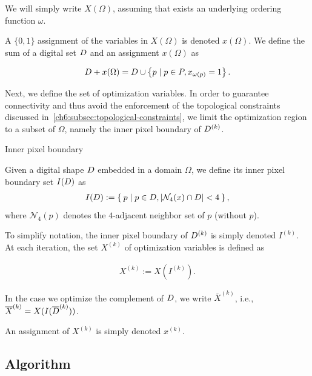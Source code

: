 We will simply write $X(\Omega)$, assuming that exists an underlying ordering function $\omega$.

A $\{0,1\}$ assignment of the variables in $X(\Omega)$ is denoted $x(\Omega)$. We define the sum of a digital set $D$ and an assignment $x(\Omega)$ as

\begin{align*}
	D + x(\Omega) = D \cup \left\{ p \; | \; p \in P, x_{\omega(p)}=1 \right\}.
\end{align*}

Next, we define the set of optimization variables. In order to guarantee connectivity and thus avoid the enforcement of the topological constraints discussed in~\cref{ch6:subsec:topological-constraints}, we limit the optimization region to a subset of $\Omega$, namely the inner pixel boundary of  $D^{(k)}$.

\begin{definition}{Inner pixel boundary}

Given a digital shape $D$ embedded in a domain $\Omega$, we define its inner pixel boundary set $I(D)$ as
\begin{align*}
	I(D) := \left\{ \: p \; | \; p \in D, |\mathcal{N}_4(x) \cap D|<4 \: \right\},
\end{align*}
where $\mathcal{N}_4(p)$ denotes the $4$-adjacent neighbor set of $p$ (without $p$). 
\end{definition}


To simplify notation, the inner pixel boundary of $D^{(k)}$ is simply denoted $I^{(k)}$. At each iteration, the set $X^{(k)}$ of optimization variables is defined as

\begin{align*}
	X^{(k)} := X(I^{(k)}).
\end{align*}

In the case we optimize the complement of $D$, we write $\overline{X}^{(k)}$, i.e., $\overline{X}^{(k)} = X(I(\overline{D}^ {(k)}))$.

An assignment of $X^{(k)}$ is simply denoted $x^{(k)}$. 


\subsection{Algorithm}
\label{ch7:subsec:algorithm}

